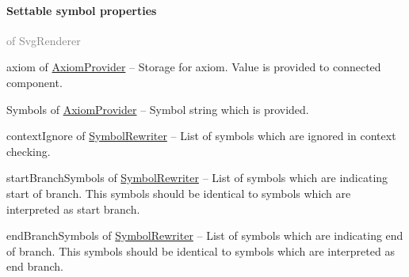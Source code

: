 	\paragraph{Settable symbol properties}\textcolor{gray}{of SvgRenderer}
	\begin{description*}
		\item[axiom] of \hyperref[Malsys.Processing.Components.Common.AxiomProvider]{AxiomProvider}
			-- Storage for axiom.
            Value is provided to connected component.
		\item[Symbols] of \hyperref[Malsys.Processing.Components.Common.AxiomProvider]{AxiomProvider}
			-- Symbol string which is provided.
		\item[contextIgnore] of \hyperref[Malsys.Processing.Components.Rewriters.SymbolRewriter]{SymbolRewriter}
			-- List of symbols which are ignored in context checking.
		\item[startBranchSymbols] of \hyperref[Malsys.Processing.Components.Rewriters.SymbolRewriter]{SymbolRewriter}
			-- List of symbols which are indicating start of branch.
            This symbols should be identical to symbols which are interpreted as start branch.
		\item[endBranchSymbols] of \hyperref[Malsys.Processing.Components.Rewriters.SymbolRewriter]{SymbolRewriter}
			-- List of symbols which are indicating end of branch.
            This symbols should be identical to symbols which are interpreted as end branch.
	\end{description*}
